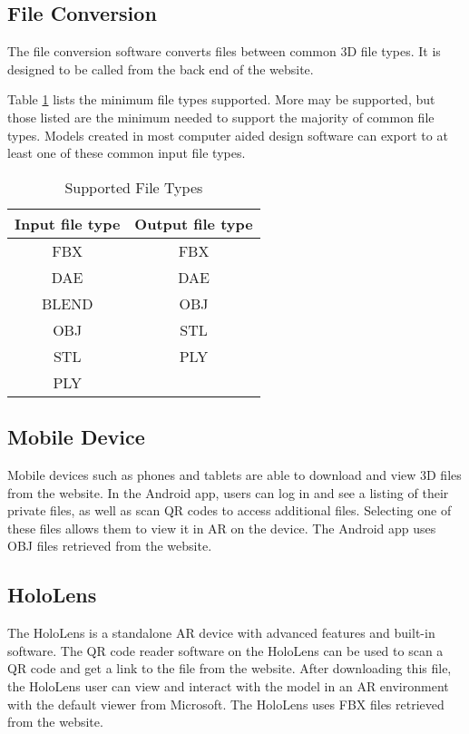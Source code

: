\subsection{File Conversion}
The file conversion software converts files between common 3D file types. It is designed to be called from the back end of the website.

Table \ref{tab:suportedfiletypes} lists the minimum file types supported.  More may be supported, but those listed are the minimum needed to support the majority of common file types.  
Models created in most computer aided design software can export to at least one of these common input file types.

\begin{table}[!h]
    \centering
    \begin{tabular}{| c | c |}
        \hline
        Input file type & Output file type \\
        \hline
        FBX & FBX \\
        DAE & DAE \\
        BLEND & OBJ \\ 
        OBJ & STL \\
        STL & PLY \\
        PLY & \\
        \hline
    \end{tabular}
    \caption{Supported File Types}
    \label{tab:suportedfiletypes}
\end{table}

\subsection{Mobile Device}
Mobile devices such as phones and tablets are able to download and view 3D files from the website. In the Android app, users can log in and see a listing of their private files, as well as scan QR codes to access additional files. Selecting one of these files allows them to view it in AR on the device. The Android app uses OBJ files retrieved from the website.

\subsection{HoloLens}
The HoloLens is a standalone AR device with advanced features and built-in software. The QR code reader software on the HoloLens can be used to scan a QR code and get a link to the file from the website. After downloading this file, the HoloLens user can view and interact with the model in an AR environment with the default viewer from Microsoft. The HoloLens uses FBX files retrieved from the website.

